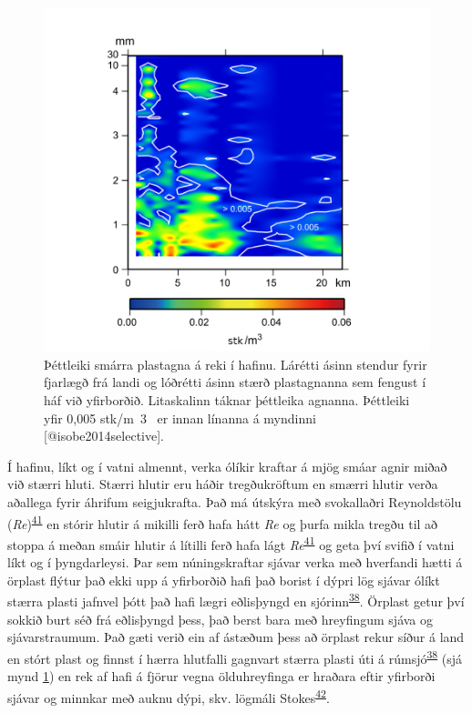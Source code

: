 \documentclass[icelandic,]{book}
\begin{document}
\begin{figure}

{\centering \includegraphics[width=0.8\linewidth]{myndir/DriftDensity_isobe2014} 

}

\caption{Þéttleiki smárra plastagna á reki í hafinu. Lárétti ásinn stendur fyrir fjarlægð frá landi og lóðrétti ásinn stærð plastagnanna sem fengust í háf við yfirborðið. Litaskalinn táknar þéttleika agnanna. Þéttleiki yfir 0,005 stk/m~3~ er innan línanna á myndinni [@isobe2014selective].}\label{fig:DriftDensity}
\end{figure}

Í hafinu, líkt og í vatni almennt, verka ólíkir kraftar á mjög smáar agnir miðað við stærri hluti. Stærri hlutir eru háðir tregðukröftum en smærri hlutir verða aðallega fyrir áhrifum seigjukrafta. Það má útskýra með svokallaðri Reynoldstölu (\emph{Re})\textsuperscript{\protect\hyperlink{ref-levinton1995marine}{41}} en stórir hlutir á mikilli ferð hafa hátt \emph{Re} og þurfa mikla tregðu til að stoppa á meðan smáir hlutir á lítilli ferð hafa lágt \emph{Re}\textsuperscript{\protect\hyperlink{ref-levinton1995marine}{41}} og geta því svifið í vatni líkt og í þyngdarleysi. Þar sem núningskraftar sjávar verka með hverfandi hætti á örplast flýtur það ekki upp á yfirborðið hafi það borist í dýpri lög sjávar ólíkt stærra plasti jafnvel þótt það hafi lægri eðlisþyngd en sjórinn\textsuperscript{\protect\hyperlink{ref-isobe2014selective}{38}}. Örplast getur því sokkið burt séð frá eðlisþyngd þess, það berst bara með hreyfingum sjáva og sjávarstraumum. Það gæti verið ein af ástæðum þess að örplast rekur síður á land en stórt plast og finnst í hærra hlutfalli gagnvart stærra plasti úti á rúmsjó\textsuperscript{\protect\hyperlink{ref-isobe2014selective}{38}} (sjá mynd \ref{fig:DriftDensity}) en rek af hafi á fjörur vegna ölduhreyfinga er hraðara eftir yfirborði sjávar og minnkar með auknu dýpi, skv. lögmáli Stokes\textsuperscript{\protect\hyperlink{ref-stokes1851effect}{42}}.
\end{document}
